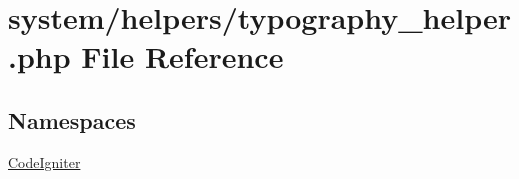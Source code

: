 \hypertarget{typography__helper_8php}{}\section{system/helpers/typography\+\_\+helper.php File Reference}
\label{typography__helper_8php}
\subsection*{Namespaces}
\begin{DoxyCompactItemize}
\item 
 \mbox{\hyperlink{namespace_code_igniter}{Code\+Igniter}}
\end{DoxyCompactItemize}
